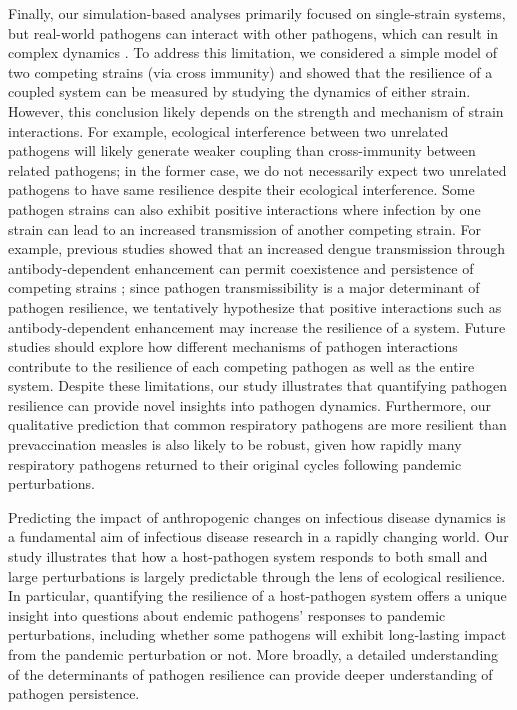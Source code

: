 \documentclass[12pt]{article}
\begin{document}
Finally, our simulation-based analyses primarily focused on single-strain systems, but real-world pathogens can interact with other pathogens, which can result in complex dynamics \citep{rohani2003ecological,nickbakhsh2019virus}.
To address this limitation, we considered a simple model of two competing strains (via cross immunity) and showed that the resilience of a coupled system can be measured by studying the dynamics of either strain. 
However, this conclusion likely depends on the strength and mechanism of strain interactions.
For example, ecological interference between two unrelated pathogens \citep{rohani2003ecological} will likely generate weaker coupling than cross-immunity between related pathogens;
in the former case, we do not necessarily expect two unrelated pathogens to have same resilience despite their ecological interference.
Some pathogen strains can also exhibit positive interactions where infection by one strain can lead to an increased transmission of another competing strain.
For example, previous studies showed that an increased dengue transmission through antibody-dependent enhancement can permit coexistence and persistence of competing strains \citep{ferguson1999effect};
since pathogen transmissibility is a major determinant of pathogen resilience, we tentatively hypothesize that positive interactions such as antibody-dependent enhancement may increase the resilience of a system.
Future studies should explore how different mechanisms of pathogen interactions contribute to the resilience of each competing pathogen as well as the entire system.
Despite these limitations, our study illustrates that quantifying pathogen resilience can provide novel insights into pathogen dynamics.
Furthermore, our qualitative prediction that common respiratory pathogens are more resilient than prevaccination measles is also likely to be robust, given how rapidly many respiratory pathogens returned to their original cycles following pandemic perturbations.

Predicting the impact of anthropogenic changes on infectious disease dynamics is a fundamental aim of infectious disease research in a rapidly changing world.
Our study illustrates that how a host-pathogen system responds to both small and large perturbations is largely predictable through the lens of ecological resilience.
In particular, quantifying the resilience of a host-pathogen system offers a unique insight into questions about endemic pathogens' responses to pandemic perturbations, including whether some pathogens will exhibit long-lasting impact from the pandemic perturbation or not.
More broadly, a detailed understanding of the determinants of pathogen resilience can provide deeper understanding of pathogen persistence.
\end{document}
